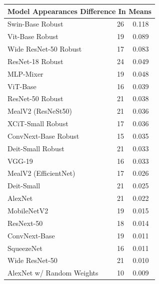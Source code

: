 \documentclass[pdflatex,sn-mathphys-num]{sn-jnl}%
\theoremstyle{thmstyleone}%
\theoremstyle{thmstyletwo}%
\theoremstyle{thmstylethree}%
\begin{document}
\begin{appendices}
    \begin{table}
        \begin{tabular}{lll}
        \multicolumn{3}{l}{Model \hspace{1.9cm} Appearances \quad Difference In Means} \\ \hline
        Swin-Base Robust          & 26          & 0.118               \\
        Vit-Base Robust           & 19          & 0.089               \\
        Wide ResNet-50 Robust     & 17          & 0.083               \\
        ResNet-18 Robust          & 24          & 0.049               \\
        MLP-Mixer                 & 19          & 0.048               \\
        ViT-Base                  & 16          & 0.039               \\
        ResNet-50 Robust          & 21          & 0.038               \\
        MealV2 (ResNeSt50)        & 21          & 0.036               \\
        XCiT-Small Robust         & 17          & 0.036               \\
        ConvNext-Base Robust      & 15          & 0.035               \\
        Deit-Small Robust         & 21          & 0.033               \\
        VGG-19                    & 16          & 0.033               \\
        MealV2 (EfficientNet)     & 17          & 0.026               \\
        Deit-Small                & 21          & 0.025               \\
        AlexNet                   & 21          & 0.022               \\
        MobileNetV2               & 19          & 0.015               \\
        ResNext-50                & 18          & 0.014               \\
        ConvNext-Base             & 19          & 0.011               \\
        SqueezeNet                & 16          & 0.011               \\
        Wide ResNet-50            & 21          & 0.010               \\
        AlexNet w/ Random Weights & 10          & 0.009               \\

\end{tabular}
\end{table}
\end{appendices}
\end{document}
